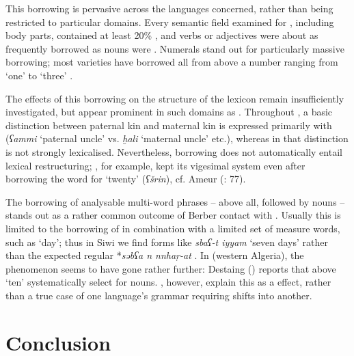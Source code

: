\documentclass[output=paper]{langsci/langscibook}
\begin{document}
This borrowing is pervasive across the languages concerned, rather than being restricted to particular domains. Every semantic field examined for , including body parts, contained at least 20\% , and verbs or adjectives were about as frequently borrowed as nouns were \citep{Kossmann2009}. Numerals stand out for particularly massive borrowing; most  varieties have borrowed all  from  above a number ranging from `one' to `three' \citep{Souag2007}.

The effects of this borrowing on the structure of the lexicon remain insufficiently investigated, but appear prominent in such domains as . Throughout , a basic distinction between paternal kin and maternal kin is expressed primarily with   (\textit{ʕammi} `paternal uncle' vs. \textit{ḫali} `maternal uncle' etc.), whereas in  that distinction is not strongly lexicalised. Nevertheless, borrowing does not automatically entail lexical restructuring; , for example, kept its vigesimal system even after borrowing the  word for `twenty' (\textit{ʕšrin}), cf. Ameur (\citeyear{Ameur2008}: 77).

The borrowing of analysable multi-word phrases – above all,  followed by nouns – stands out as a rather common outcome of Berber contact with . Usually this is limited to the borrowing of  in combination with a limited set of measure words, such as `day'; thus in Siwi we find forms like \textit{sbaʕ-t iyyam} `seven days' rather than the expected regular  *\textit{səbʕa n nnhaṛ-at} \citep[114]{Souag2013book}. In  (western Algeria), the phenomenon seems to have gone rather further: Destaing (\citeyear[212]{Destaing1907}) reports that  above `ten' systematically select for  nouns.  \citet{SouagKherbache2016}, however, explain this as a  effect, rather than a true case of one language's grammar requiring shifts into another.

\section{Conclusion}
\end{document}
